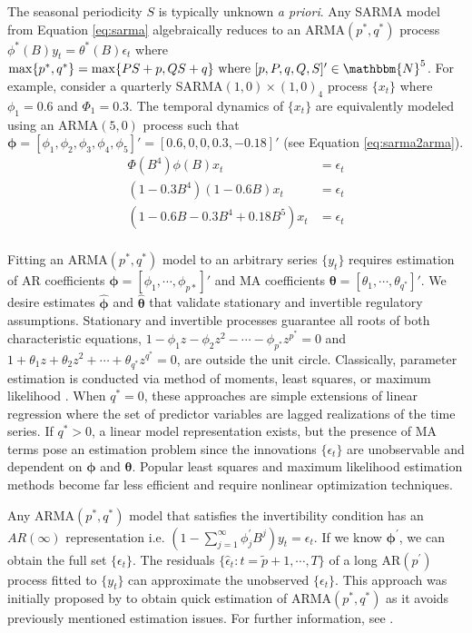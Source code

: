 The seasonal periodicity $S$ is typically unknown \textit{a priori}. Any SARMA model from Equation \ref{eq:sarma} algebraically reduces to an ARMA$(p^*,q^*)$ process $\phi^*(B)y_t=\theta^*(B)\epsilon_t$ where $\max\{p^*,q^*\}=\max\{PS+p,QS+q\} \textrm{ where } [p,P,q,Q,S]'\in\mathbbm{N}^5$. For example, consider a quarterly SARMA$(1,0)\times(1,0)_{4}$ process $\{x_t\}$ where $\phi_1=0.6$ and $\Phi_1=0.3$. The temporal dynamics of $\{x_t\}$ are equivalently modeled using an ARMA$(5,0)$ process such that $\bm{\phi}=[\phi_1,\phi_2,\phi_3,\phi_4,\phi_5]'=[0.6,0,0,0.3,-0.18]'$ (see Equation \ref{eq:sarma2arma}).
\begin{equation}
\label{eq:sarma2arma}
\begin{split}
\Phi(B^4)\phi(B)x_t&=\epsilon_t\\
(1-0.3B^4)(1-0.6B)x_t&=\epsilon_t\\
(1-0.6B-0.3B^4+0.18B^5)x_t&=\epsilon_t\\
\end{split}
\end{equation}

Fitting an ARMA$(p^*,q^*)$ model to an arbitrary series $\{y_t\}$ requires estimation of AR coefficients $\bm{\phi}=[\phi_1,\cdots,\phi_{p*}]'$ and MA coefficients $\bm{\theta}=[\theta_1,\cdots,\theta_{q^*}]'$. We desire estimates $\hat{\bm{\phi} }$ and $\hat{\bm{\theta} }$ that validate stationary and invertible regulatory assumptions. Stationary and invertible processes guarantee all roots of both characteristic equations, $1-\phi_1z-\phi_2z^2-\cdots -\phi_{p^*}z^{p^*}=0$ and $1+\theta_1z+\theta_2z^2+\cdots +\theta_{q^*}z^{q^*}=0$, are outside the unit circle. Classically, parameter estimation is conducted via method of moments, least squares, or maximum likelihood \citep{Hamilton1994, Cryer2008}. When $q^*=0$, these approaches are simple extensions of linear regression where the set of predictor variables are lagged realizations of the time series. If $q^*>0$, a linear model representation exists, but the presence of MA terms pose an estimation problem since the innovations $\{\epsilon_t\}$ are unobservable and dependent on $\bm{\phi}$ and $\bm{\theta}$. Popular least squares and maximum likelihood estimation methods become far less efficient and require nonlinear optimization techniques.

Any ARMA$(p^*,q^*)$ model that satisfies the invertibility condition has an $AR(\infty)$ representation i.e. $(1-\sum\limits_{j=1}^\infty \phi^\prime_jB^j)y_t=\epsilon_t$. If we know $\bm{\phi}^\prime$, we can obtain the full set $\{\epsilon_t\}$. The residuals $\{\hat{\epsilon}_t: t=\tilde{p}+1,\cdots,T\}$ of a long AR$(p^\prime)$ process fitted to  $\{y_t\}$ can approximate the unobserved $\{\epsilon_t\}$.  This approach was initially proposed by \cite{Hannan1982} to obtain quick estimation of ARMA$(p^*,q^*)$ as it avoids previously mentioned estimation issues. For further information, see \cite[pg.156]{Brockwell2016}.

